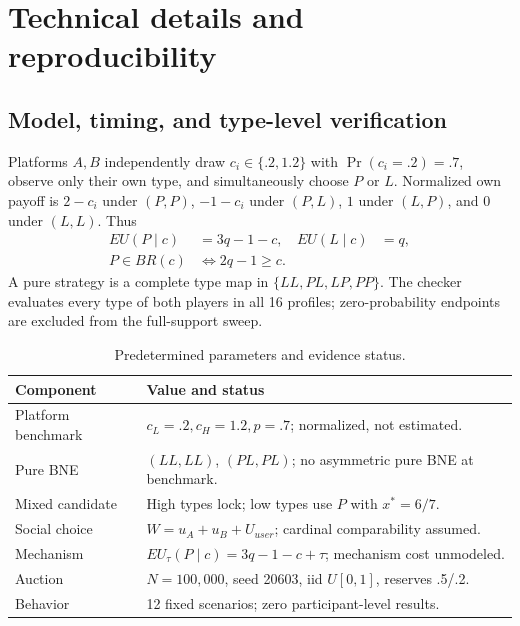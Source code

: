 

\appendix
\section{Technical details and reproducibility}
\label{app:technical}
\subsection{Model, timing, and type-level verification}
Platforms $A,B$ independently draw $c_i\in\{.2,1.2\}$ with $\Pr(c_i=.2)=.7$, observe only their own type, and simultaneously choose $P$ or $L$. Normalized own payoff is $2-c_i$ under $(P,P)$, $-1-c_i$ under $(P,L)$, $1$ under $(L,P)$, and $0$ under $(L,L)$. Thus
\[
\begin{aligned}
EU(P\mid c)&=3q-1-c, & EU(L\mid c)&=q,\\
P\in BR(c)&\Longleftrightarrow 2q-1\ge c.&&
\end{aligned}
\]
A pure strategy is a complete type map in $\{LL,PL,LP,PP\}$. The checker evaluates every type of both players in all 16 profiles; zero-probability endpoints are excluded from the full-support sweep.

\begin{table}[h]
\caption{Predetermined parameters and evidence status.}
\begin{tabularx}{\columnwidth}{@{}p{2.3cm}Y@{}}\toprule
\textbf{Component}&\textbf{Value and status}\\\midrule
Platform benchmark&$c_L=.2,c_H=1.2,p=.7$; normalized, not estimated.\\
Pure BNE&$(LL,LL)$, $(PL,PL)$; no asymmetric pure BNE at benchmark.\\
Mixed candidate&High types lock; low types use $P$ with $x^*=6/7$.\\
Social choice&$W=u_A+u_B+U_{user}$; cardinal comparability assumed.\\
Mechanism&$EU_\tau(P\mid c)=3q-1-c+\tau$; mechanism cost unmodeled.\\
Auction&$N=100{,}000$, seed 20603, iid $U[0,1]$, reserves .5/.2.\\
Behavior&12 fixed scenarios; zero participant-level results.\\\bottomrule
\end{tabularx}
\end{table}

